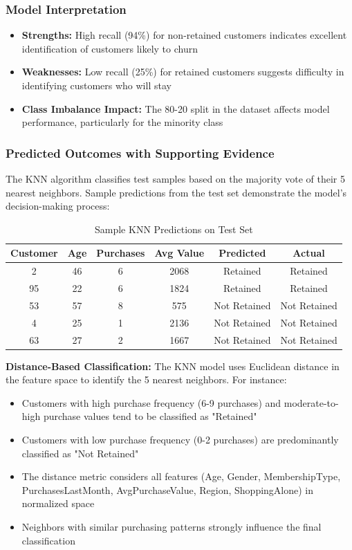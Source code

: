 \documentclass[12pt,a4paper]{article}
\begin{document}
\subsubsection{Model Interpretation}
\begin{itemize}
    \item \textbf{Strengths:} High recall (94\%) for non-retained customers indicates excellent identification of customers likely to churn
    \item \textbf{Weaknesses:} Low recall (25\%) for retained customers suggests difficulty in identifying customers who will stay
    \item \textbf{Class Imbalance Impact:} The 80-20 split in the dataset affects model performance, particularly for the minority class
\end{itemize}

\subsubsection{Predicted Outcomes with Supporting Evidence}
The KNN algorithm classifies test samples based on the majority vote of their 5 nearest neighbors. Sample predictions from the test set demonstrate the model's decision-making process:

\begin{table}[H]
\centering
\small
\begin{tabular}{@{}cccccc@{}}
\toprule
\textbf{Customer} & \textbf{Age} & \textbf{Purchases} & \textbf{Avg Value} & \textbf{Predicted} & \textbf{Actual} \\ \midrule
2 & 46 & 6 & 2068 & Retained & Retained \\
95 & 22 & 6 & 1824 & Retained & Retained \\
53 & 57 & 8 & 575 & Not Retained & Not Retained \\
4 & 25 & 1 & 2136 & Not Retained & Not Retained \\
63 & 27 & 2 & 1667 & Not Retained & Not Retained \\ \bottomrule
\end{tabular}
\caption{Sample KNN Predictions on Test Set}
\end{table}

\textbf{Distance-Based Classification:} The KNN model uses Euclidean distance in the feature space to identify the 5 nearest neighbors. For instance:
\begin{itemize}
    \item Customers with high purchase frequency (6-9 purchases) and moderate-to-high purchase values tend to be classified as "Retained"
    \item Customers with low purchase frequency (0-2 purchases) are predominantly classified as "Not Retained"
    \item The distance metric considers all features (Age, Gender, MembershipType, PurchasesLastMonth, AvgPurchaseValue, Region, ShoppingAlone) in normalized space
    \item Neighbors with similar purchasing patterns strongly influence the final classification
\end{itemize}
\end{document}
